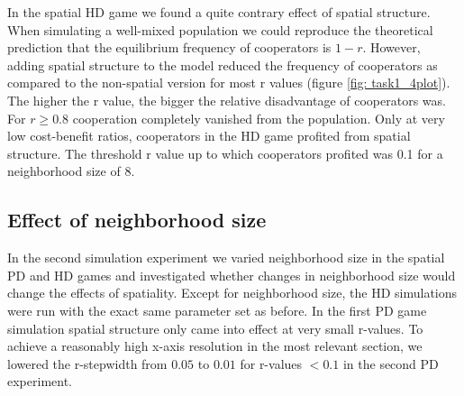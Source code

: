 In the spatial HD game we found a quite contrary effect of spatial structure. When simulating a well-mixed population we could reproduce the theoretical prediction that the equilibrium frequency of cooperators is $1 - r$. However, adding spatial structure to the model reduced the frequency of cooperators as compared to the non-spatial version for most r values (figure \ref{fig: task1_4plot}). The higher the r value, the bigger the relative disadvantage of cooperators was. For $r \geq 0.8$ cooperation completely vanished from the population. Only at very low cost-benefit ratios, cooperators in the HD game profited from spatial structure. The threshold r value up to which cooperators profited was 0.1 for a neighborhood size of 8.



\subsection{Effect of neighborhood size}

In the second simulation experiment we varied neighborhood size in the spatial PD and HD games and investigated whether changes in neighborhood size would change the effects of spatiality. Except for neighborhood size, the HD simulations were run with the exact same parameter set as before. In the first PD game simulation spatial structure only came into effect at very small r-values. To achieve a reasonably high x-axis resolution in the most relevant section, we lowered the r-stepwidth from $0.05$ to $0.01$ for r-values $< 0.1$ in the second PD experiment.

